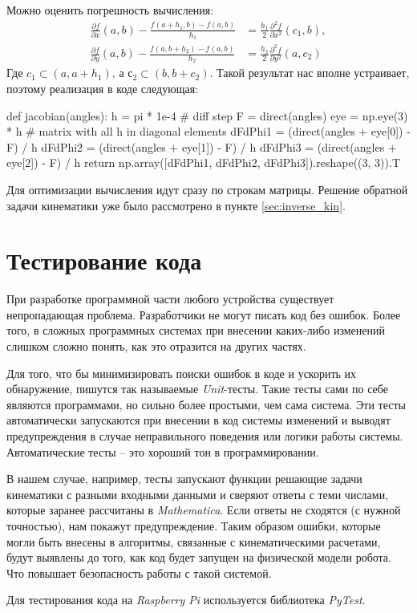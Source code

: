 \noindent Можно оценить погрешность вычисления:
\begin{align*}
    \frac{\partial f}{\partial x}(a, b) - \frac{f(a+h_1, b) - f(a, b)}{h_1} &= \frac{h_1}{2} \frac{\partial^2 f}{\partial x^2}(c_1, b), \\ 
    \frac{\partial f}{\partial y}(a, b) - \frac{f(a, b+h_2) - f(a, b)}{h_2} &= \frac{h_2}{2} \frac{\partial^2 f}{\partial y^2}(a, c_2)
\end{align*}
\noindent Где $ c_1 \subset (a, a+h_1) $, а $ с_2 \subset (b, b+c_2) $. Такой результат нас вполне устраивает, поэтому реализация в коде следующая:
\begin{python}
def jacobian(angles):
    h = pi * 1e-4 # diff step
    F = direct(angles)
    eye = np.eye(3) * h # matrix with all h in diagonal elements
    dFdPhi1 = (direct(angles + eye[0]) - F) / h
    dFdPhi2 = (direct(angles + eye[1]) - F) / h
    dFdPhi3 = (direct(angles + eye[2]) - F) / h
    return np.array([dFdPhi1, dFdPhi2, dFdPhi3]).reshape((3, 3)).T
\end{python}

\noindent Для оптимизации вычисления идут сразу по строкам матрицы.
Решение обратной задачи кинематики уже было рассмотрено в пункте \ref{sec:inverse_kin}.

\section{Тестирование кода}

При разработке программной части любого устройства существует непропадающая проблема. Разработчики не могут писать код без ошибок. Более того, в сложных программных системах при внесении каких-либо изменений слишком сложно понять, как это отразится на других частях.

Для того, что бы минимизировать поиски ошибок в коде и ускорить их обнаружение, пишутся так называемые \textit{Unit}-тесты. Такие тесты сами по себе являются программами, но сильно более простыми, чем сама система. Эти тесты автоматически запускаются при внесении в код системы изменений и выводят предупреждения в случае неправильного поведения или логики работы системы.
Автоматические тесты -- это хороший тон в программировании.

В нашем случае, например, тесты запускают функции решающие задачи кинематики с разными входными данными и сверяют ответы с теми числами, которые заранее рассчитаны в \textit{Mathematica}. Если ответы не сходятся (с нужной точностью), нам покажут предупреждение. Таким образом ошибки, которые могли быть внесены в алгоритмы, связанные с кинематическими расчетами, будут выявлены до того, как код будет запущен на физической модели робота. Что повышает безопасность работы с такой системой.

Для тестирования кода на \textit{Raspberry Pi} используется библиотека \textit{PyTest}.

